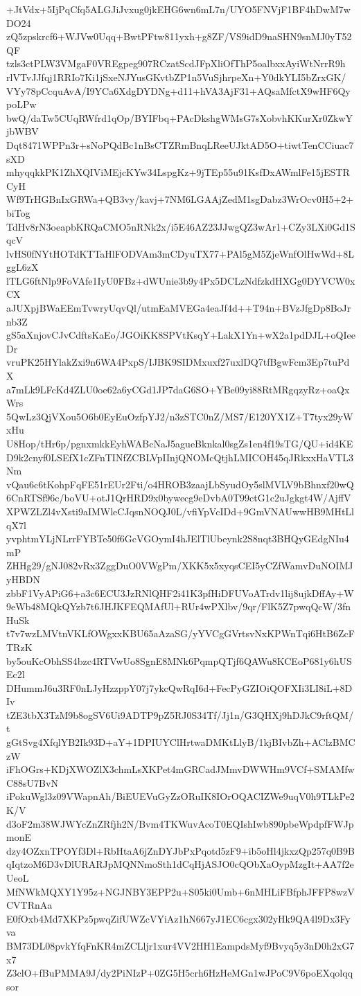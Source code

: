 +JtVdx+5IjPqCfq5ALGJiJvxug0jkEHG6wn6mL7n/UYO5FNVjF1BF4hDwM7wDO24
zQ5zpskrcf6+WJVw0Uqq+BwtPFtw811yxh+g8ZF/VS9idD9naSHN9snMJ0yT52QF
tzls3ctPLW3VMgaF0VREgpeg907RCzatScdJFpXliOfThP5oalbxxAyiWtNrrR9h
rlVTvJJfqj1RRIo7Ki1jSxeNJYusGKvtbZP1n5VuSjhrpeXn+Y0dkYLI5bZrxGK/
VYy78pCcquAvA/I9YCa6XdgDYDNg+d11+hVA3AjF31+AQsaMfctX9wHF6QypoLPw
bwQ/daTw5CUqRWfrd1qOp/BYIFbq+PAcDkshgWMsG7sXobvhKKurXr0ZkwYjbWBV
Dqt8471WPPn3r+sNoPQdBc1nBsCTZRmBnqLReeUJktAD5O+tiwtTenCCiuac7sXD
mhyqqkkPK1ZhXQIViMEjcKYw34LspgKz+9jTEp55u91KsfDxAWmlFe15jESTRCyH
Wf9TrHGBnIxGRWa+QB3vy/kavj+7NM6LGAAjZedM1sgDabz3WrOcv0H5+2+biTog
TdHv8rN3oeapbKRQaCMO5nRNk2x/i5E46AZ23JJwgQZ3wAr1+CZy3LXi0Gd1SqcV
lvHS0fNYtHOTdKTTaHlFODVAm3mCDyuTX77+PAl5gM5ZjeWnfOlHwWd+8LggL6zX
lTLG6ftNlp9FoVAfe1IyU0FBz+dWUnie3b9y4Px5DCLzNdfzkdHXGg0DYVCW0xCX
aJUXpjBWaEEmTvwryUqvQl/utmEaMVEGa4eaJf4d++T94n+BVzJfgDp8BoJrnb3Z
gS5aXnjovCJvCdftsKaEo/JGOiKK8SPVtKsqY+LakX1Yn+wX2a1pdDJL+oQIeeDr
vruPK25HYlakZxi9n6WA4PxpS/IJBK9SIDMxuxf27uxlDQ7tfBgwFcm3Ep7tuPdX
a7mLk9LFcKd4ZLU0oe62a6yCGd1JP7daG6SO+YBe09yi88RtMRgqzyRz+oaQxWrs
5QwLz3QjVXou5O6b0EyEuOzfpYJ2/n3zSTC0nZ/MS7/E120YX1Z+T7tyx29yWxHu
U8Hop/tHr6p/pgnxmkkEyhWABcNaJ5agueBknkal0sgZs1en4f19sTG/QU+id4KE
D9k2cnyf0LSEfX1cZFnTINfZCBLVpIInjQNOMcQtjhLMICOH45qJRkxxHaVTL3Nm
vQau6c6tKohpFqFE51rEUr2Fti/o4HROB3zaajLbSyudOy5slMVLV9bBhnxf20wQ
6CnRTSf96c/boVU+otJ1QrHRD9x0bywecg9eDvbA0T99ctG1c2uJgkgt4W/AjffV
XPWZLZl4vXsti9aIMWleCJqsnNOQJ0L/vfiYpVcIDd+9GmVNAUwwHB9MHtLlqX7l
yvphtmYLjNLrrFYBTe50f6GcVGOymI4hJElTlUbeynk2S8nqt3BHQyGEdgNIu4mP
ZHHg29/gNJ082vRx3ZggDuO0VWgPm/XKK5x5xyqsCEI5yCZfWamvDuNOIMJyHBDN
zbbF1VyAPiG6+a3c6ECU3JzRNlQHF2i41K3pfHiDFUVoATrdv1lij8ujkDffAy+W
9eWb48MQkQYzb7t6JHJKFEQMAfUl+RUr4wPXlbv/9qr/FlK5Z7pwqQcW/3fnHuSk
t7v7wzLMVtnVKLfOWgxxKBU65aAzaSG/yYVCgGVrtsvNxKPWnTqi6HtB6ZcFTRzK
by5ouKcObhSS4bzc4RTVwUo8SgnE8MNk6PqmpQTjf6QAWu8KCEoP681y6hUSEc2l
DHummJ6u3RF0nLJyHzzppY07j7ykcQwRqI6d+FecPyGZIOiQOFXIi3LI8iL+8DIv
tZE3tbX3TzM9b8ogSV6Ui9ADTP9pZ5RJ0S34Tf/Jj1n/G3QHXj9hDJkC9rftQM/t
gGtSvg4XfqlYB2Ik93D+aY+1DPIUYClHrtwaDMKtLlyB/1kjBIvbZh+AClzBMCzW
iFhOGrs+KDjXWOZlX3chmLsXKPet4mGRCadJMmvDWWHm9VCf+SMAMfwC88sU7BvN
iPokuWgl3z09VWapnAh/BiEUEVuGyZzORuIK8IOrOQACIZWe9uqV0h9TLkPe2K/V
d3oF2m38WJWYcZnZRfjh2N/Bvm4TKWuvAcoT0EQIshIwb890pbeWpdpfFWJpmonE
dzy4OZxnTPOYf3Dl+RbHtaA6jZnDYJbPxPqotd5zF9+ib5oHl4jkxzQp257q0B9B
qIqtzoM6D3vDlURARJpMQNNmoSth1dCqHjASJO0cQObXaOypMzgIt+AA7f2eUeoL
MfNWkMQXY1Y95z+NGJNBY3EPP2u+S05ki0Umb+6nMHLiFBfphJFFP8wzVCVTRnAa
E0fOxb4Md7XKPz5pwqZifUWZcVYiAz1hN667yJ1EC6cgx302yHk9QA4l9Dx3Fyva
BM73DL08pvkYfqFnKR4mZCLljr1xur4VV2HH1EampdsMyf9Bvyq5y3nD0h2xG7x7
Z3clO+fBuPMMA9J/dy2PiNIzP+0ZG5H5crh6HzHeMGn1wJPoC9V6poEXqolqqsor
